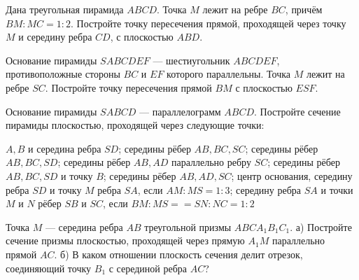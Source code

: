 \begin{homework}[number=2]
	\begin{listofex}
		\item Дана треугольная пирамида \(ABCD\). Точка \(M\) лежит на ребре \(BC\), причём \(BM:MC = 1:2\). Постройте точку пересечения прямой, проходящей через точку \(M\) и середину ребра \(CD\), с плоскостью \(ABD\).
		\item Основание пирамиды \(SABCDEF\) --- шестиугольник \(ABCDEF\), противоположные стороны \(BC\) и \(EF\) которого параллельны. Точка \(M\) лежит на ребре \(SC\). Постройте точку пересечения прямой \(BM\) с плоскостью \(ESF\).
		\item Основание пирамиды \(SABCD\) --- параллелограмм \(ABCD\). Постройте сечение пирамиды плоскостью, проходящей через следующие точки:
		\begin{itasks}[1]
			\task \(A, B\) и середина ребра \(SD\);
			\task середины рёбер \(AB, BC, SC\);
			\task середины рёбер \(AB, BC, SD\);
			\task середины рёбер \(AB, AD\) параллельно ребру \(SC\);
			\task середины рёбер \(AB, BC, SD\) и точку \(B\);
			\task середины рёбер \(AB, AD, SC\);
			\task центр основания, середину ребра \(SD\) и точку \(M\) ребра \(SA\), если \(AM:MS = 1:3\);
			\task середину ребра \(SA\) и точки \(M\) и \(N\) рёбер \(SB\) и \(SC\), если \(BM : MS = = SN :NC=1:2\)
		\end{itasks}
		\item Точка \(M\) — середина ребра \(AB\) треугольной призмы \(ABCA_1B_1C_1\). а) Постройте сечение призмы плоскостью, проходящей через прямую \(A_1M\) параллельно прямой \(AC\). б) В каком отношении плоскость сечения делит отрезок, соединяющий точку \(B_1\) с серединой ребра \(AC\)?
	\end{listofex}
\end{homework}

